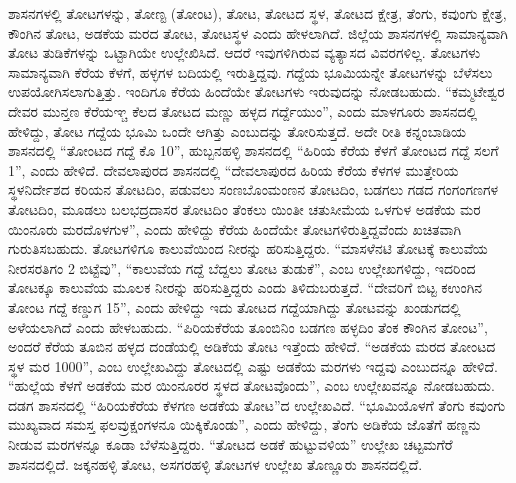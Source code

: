ಶಾಸನಗಳಲ್ಲಿ ತೋಟಗಳನ್ನು, ತೋಣ್ಟ (ತೋಂಟ), ತೋಟ, ತೋಟದ ಸ್ಥಳ, ತೋಟದ ಕ್ಷೇತ್ರ, ತೆಂಗು, ಕವುಂಗು ಕ್ಷೇತ್ರ, ಕೌಂಗಿನ ತೋಟ, ಅಡಕೆಯ ಮರದ ತೋಟ, ತೋಟಸ್ಥಳ ಎಂದು ಹೇಳಲಾಗಿದೆ. ಜಿಲ್ಲೆಯ ಶಾಸನಗಳಲ್ಲಿ ಸಾಮಾನ್ಯವಾಗಿ ತೋಟ ತುಡಿಕೆಗಳನ್ನು ಒಟ್ಟಾಗಿಯೇ ಉಲ್ಲೇಖಿಸಿದೆ. ಆದರೆ ಇವುಗಳಿಗಿರುವ ವ್ಯತ್ಯಾಸದ ವಿವರಗಳಿಲ್ಲ. ತೋಟಗಳು ಸಾಮಾನ್ಯವಾಗಿ ಕೆರೆಯ ಕೆಳಗೆ, ಹಳ್ಳಗಳ ಬದಿಯಲ್ಲಿ ಇರುತ್ತಿದ್ದವು. ಗದ್ದೆಯ ಭೂಮಿಯನ್ನೇ ತೋಟಗಳನ್ನು ಬೆಳೆಸಲು ಉಪಯೋಗಿಸಲಾಗುತ್ತಿತ್ತು. ಇಂದಿಗೂ ಕೆರೆಯ ಹಿಂದೆಯೇ ತೋಟಗಳು ಇರುವುದನ್ನು ನೋಡಬಹುದು. “ಕಮ್ಮಟೇಶ್ವರ ದೇವರ ಮುನ್ತಣ ಕೆರೆಯಞ್ಚ ಕೆಲದ ತೋಟದ ಮಣ್ಣು ಹಳ್ಳದ ಗರ್ದ್ದೆಯುಂ”, ಎಂದು ಮಾಳಗೂರು ಶಾಸನದಲ್ಲಿ ಹೇಳಿದ್ದು, ತೋಟ ಗದ್ದೆಯ ಭೂಮಿ ಒಂದೇ ಆಗಿತ್ತು ಎಂಬುದನ್ನು ತೋರಿಸುತ್ತದೆ. ಅದೇ ರೀತಿ ಕನ್ನಂಬಾಡಿಯ ಶಾಸನದಲ್ಲಿ “ತೋಂಟದ ಗದ್ದೆ ಕೊ 10”, ಹುಬ್ಬನಹಳ್ಳಿ ಶಾಸನದಲ್ಲಿ “ಹಿರಿಯ ಕೆರೆಯ ಕೆಳಗೆ ತೋಂಟದ ಗದ್ದೆ ಸಲಗೆ 1”, ಎಂದು ಹೇಳಿದೆ. ದೇವಲಾಪುರದ ಶಾಸನದಲ್ಲಿ “ದೇವಲಾಪುರದ ಹಿರಿಯ ಕೆರೆಯ ಕೆಳಗಳ ಮುತ್ತೇರಿಯ ಸ್ಥಳನಿರ್ದೇಶದ ಕರಿಯನ ತೋಟದಿಂ, ಪಡುವಲು ಸಂಣಬೊಂಮಂಣನ ತೋಟದಿಂ, ಬಡಗಲು ಗಡದ ಗಂಗಂಗಣಗಳ ತೋಟದಿಂ, ಮೂಡಲು ಬಲಭದ್ರದಾಸರ ತೋಟದಿಂ ತೆಂಕಲು ಯಿಂತೀ ಚತುಸೀಮೆಯ ಒಳಗುಳ ಅಡಕೆಯ ಮರ ಯಿಂನೂರು ಮರದೊಳಗುಳ”, ಎಂದು ಹೇಳಿದ್ದು ಕೆರೆಯ ಹಿಂದೆಯೇ ತೋಟಗಳಿರುತ್ತಿದ್ದವೆಂದು ಖಚಿತವಾಗಿ ಗುರುತಿಸಬಹುದು. ತೋಟಗಳಿಗೂ ಕಾಲುವೆಯಿಂದ ನೀರನ್ನು ಹರಿಸುತ್ತಿದ್ದರು. “ಮಾಸಳೆನಟಿ ತೋಟಕ್ಕೆ ಕಾಲುವೆಯ ನೀರಸರತಿಗಂ 2 ಬಿಟ್ಟೆವು”, “ಕಾಲುವೆಯ ಗದ್ದೆ ಬೆದ್ದಲು ತೋಟ ತುಡುಕೆ”, ಎಂಬ ಉಲ್ಲೇಖಗಳಿದ್ದು, ಇದರಿಂದ ತೋಟಕ್ಕೂ ಕಾಲುವೆಯ ಮೂಲಕ ನೀರನ್ನು ಹರಿಸುತ್ತಿದ್ದರು ಎಂದು ತಿಳಿದುಬರುತ್ತದೆ. “ದೇವರಿಗೆ ಬಿಟ್ಟ ಕಉಂಗಿನ ತೋಂಟ ಗದ್ದೆ ಕಣ್ಡುಗ 15”, ಎಂದು ಹೇಳಿದ್ದು ಇದು ತೋಟದ ಗದ್ದೆಯಾಗಿದ್ದು ತೋಟವನ್ನು ಖಂಡುಗದಲ್ಲಿ ಅಳೆಯಲಾಗಿದೆ ಎಂದು ಹೇಳಬಹುದು. “ಪಿರಿಯಕೆರೆಯ ತೂಂಬಿನಿಂ ಬಡಗಣ ಹಳ್ಳದಿಂ ತೆಂಕ ಕೌಂಗಿನ ತೋಂಟ”, ಅಂದರೆ ಕೆರೆಯ ತೂಬಿನ ಹಳ್ಳದ ದಂಡೆಯಲ್ಲಿ ಅಡಿಕೆಯ ತೋಟ ಇತ್ತೆಂದು ಹೇಳಿದೆ. “ಅಡಕೆಯ ಮರದ ತೋಂಟದ ಸ್ಥಳ ಮರ 1000”, ಎಂಬ ಉಲ್ಲೇಖವಿದ್ದು ತೋಟದಲ್ಲಿ ಎಷ್ಟು ಅಡಕೆಯ ಮರಗಳು ಇದ್ದವು ಎಂಬುದನ್ನೂ ಹೇಳಿದೆ. “ಹುಲ್ಲೆಯ ಕೆಳಗೆ ಅಡಕೆಯ ಮರ ಯಿಂನೂರರ ಸ್ಥಳದ ತೋಟವೊಂದು”, ಎಂಬ ಉಲ್ಲೇಖವನ್ನೂ ನೋಡಬಹುದು. ದಡಗ ಶಾಸನದಲ್ಲಿ “ಹಿರಿಯಕೆರೆಯ ಕೆಳಗಣ ಅಡಕೆಯ ತೋಟ”ದ ಉಲ್ಲೇಖವಿದೆ. “ಭೂಮಿಯೊಳಗೆ ತೆಂಗು ಕವುಂಗು ಮುಖ್ಯವಾದ ಸಮಸ್ತ ಫಲವ್ರುಕ್ಷಂಗಳನೂ ಯಿಕ್ಕಿಕೊಂಡು”, ಎಂದು ಹೇಳಿದ್ದು, ತೆಂಗು ಅಡಿಕೆಯ ಜೊತೆಗೆ ಹಣ್ಣನು ನೀಡುವ ಮರಗಳನ್ನೂ ಕೂಡಾ ಬೆಳೆಸುತ್ತಿದ್ದರು. “ತೋಟದ ಅಡಕೆ ಹುಟ್ಟುವಳಿಯ” ಉಲ್ಲೇಖ ಚಟ್ಟಮಗೆರೆ ಶಾಸನದಲ್ಲಿದೆ. ಜಕ್ಕನಹಳ್ಳಿ ತೋಟ, ಅಸಗರಹಳ್ಳಿ ತೋಟಗಳ ಉಲ್ಲೇಖ ತೊಣ್ಣೂರು ಶಾಸನದಲ್ಲಿದೆ.

